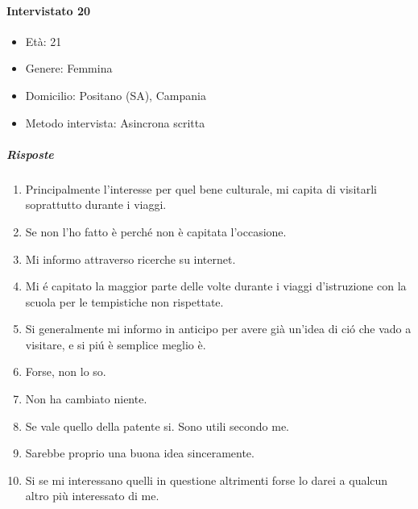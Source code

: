 \documentclass{article}
\begin{document}
\paragraph{Intervistato 20}
\begin{itemize}
\item Età: 21
\item Genere: Femmina
\item Domicilio: Positano (SA), Campania
\item Metodo intervista: Asincrona scritta
\end{itemize}
\subparagraph{Risposte}
\begin{enumerate}
\item Principalmente l'interesse per quel bene culturale, mi capita di visitarli soprattutto durante i viaggi.
\item Se non l'ho fatto è perché non è capitata l'occasione.
\item Mi informo attraverso ricerche su internet.
\item Mi é capitato la maggior parte delle volte durante i viaggi d'istruzione con la scuola per le tempistiche non rispettate.
\item Si generalmente mi informo in anticipo per avere già un'idea di ció che vado a visitare, e si piú è semplice meglio è.
\item Forse, non lo so.
\item Non ha cambiato niente.
\item Se vale quello della patente si. Sono utili secondo me.
\item Sarebbe proprio una buona idea sinceramente.
\item Si se mi interessano quelli in questione altrimenti forse lo darei a qualcun altro più interessato di me.
\end{enumerate}
\end{document}
